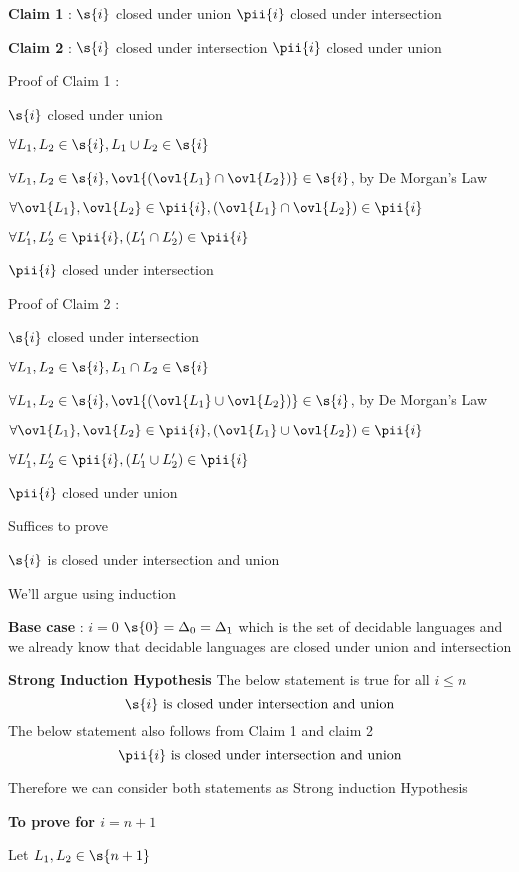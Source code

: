 
\textbf{Claim 1} : $\s{i}$ closed under union \imp
$\pii{i}$ closed under intersection

\textbf{Claim 2} : $\s{i}$ closed under intersection \imp
$\pii{i}$ closed under union

Proof of Claim 1 : 


$\s{i}$ closed under union

\imp
$\forall L_1, L_2 \in \s{i}, L_1 \cup L_2 \in \s{i}$

\imp
$\forall L_1, L_2 \in \s{i}, \ovl{(\ovl{L_1} \cap \ovl{L_2})} \in \s{i}$, by De Morgan's Law

\imp
$\forall \ovl{L_1}, \ovl{L_2} \in \pii{i}, {(\ovl{L_1} \cap \ovl{L_2})} \in \pii{i}$

\imp
$\forall L_1', L_2' \in \pii{i}, {(L_1' \cap L_2')} \in \pii{i}$

\imp
$\pii{i}$ closed under intersection

Proof of Claim 2 : 


$\s{i}$ closed under intersection

\imp
$\forall L_1, L_2 \in \s{i}, L_1 \cap L_2 \in \s{i}$

\imp
$\forall L_1, L_2 \in \s{i}, \ovl{(\ovl{L_1} \cup \ovl{L_2})} \in \s{i}$, by De Morgan's Law

\imp
$\forall \ovl{L_1}, \ovl{L_2} \in \pii{i}, {(\ovl{L_1} \cup \ovl{L_2})} \in \pii{i}$

\imp
$\forall L_1', L_2' \in \pii{i}, {(L_1' \cup L_2')} \in \pii{i}$

\imp
$\pii{i}$ closed under union

Suffices to prove

$\s{i}$ is closed under intersection and union

We'll argue using induction

\textbf{Base case} : $i = 0$
$\s{0} = \Delta_0 = \Delta_1$ which is the set of decidable languages and we already know that decidable languages are closed under union and intersection

\textbf{Strong Induction Hypothesis}
The below statement is true for all $i \leq n$
$$
\s{i} \text{ is closed under intersection and union}
$$
The below statement also follows from Claim 1 and claim 2
$$
\pii{i} \text{ is closed under intersection and union}
$$

Therefore we can consider both statements as Strong induction Hypothesis

\textbf{To prove for $i = n + 1$}

Let $L_1, L_2 \in \s{n + 1}$

